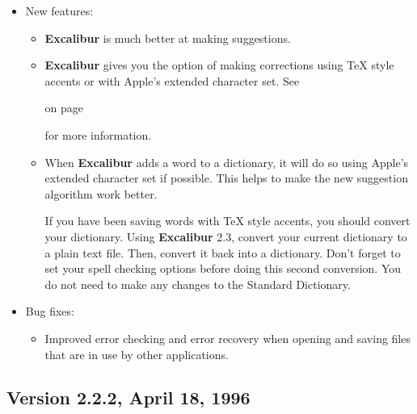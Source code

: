 ﻿\documentclass[11pt,titlepage]{article}
\newcommand{\ex}{\textbf{Excalibur}}
\begin{document}
\begin{itemize}
\item New features:
  \begin{itemize}
  \item \ex{} is much better at making suggestions.

  \item \ex{} gives you the option of making corrections using \TeX{}
    style accents or with Apple's extended character set.  See
    \begin{latexonly}
      on page~\pageref{sec:latex-options}
    \end{latexonly}
    for more information.

  \item When \ex{} adds a word to a dictionary, it will do so using
    Apple's extended character set if possible.  This helps to make
    the new suggestion algorithm work better.

    If you have been saving words with \TeX{} style accents, you
    should convert your dictionary.  Using \ex{} 2.3, convert your
    current dictionary to a plain text file.  Then, convert it back
    into a dictionary.  Don't forget to set your spell checking
    options before doing this second conversion.  You do not need to
    make any changes to the Standard Dictionary.

  \end{itemize}

\item Bug fixes:
  \begin{itemize}
  \item Improved error checking and error recovery when opening and
    saving files that are in use by other applications.
  \end{itemize}
\end{itemize}

\subsection{Version 2.2.2, April 18, 1996}
\end{document}
